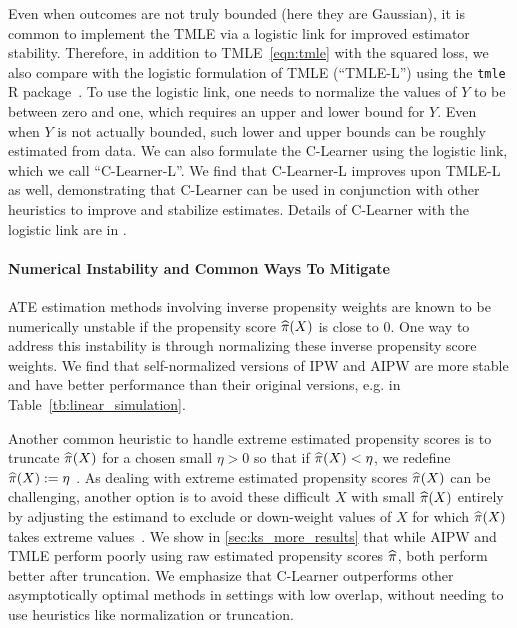 Even when outcomes are not truly bounded (here they are Gaussian), it is common to implement the TMLE via a logistic link for improved estimator stability. Therefore, %
in addition to TMLE~\eqref{eqn:tmle} with the squared loss, we also compare with the logistic formulation of TMLE (``TMLE-L'') using the \texttt{tmle} R package~\citep{gruber2012tmle}. To use the logistic link, one needs to normalize the values of $Y$ to be between zero and one, which requires an upper and lower bound for $Y$. Even when $Y$ is not actually bounded, such lower and upper bounds can be roughly estimated from data. %
We can also formulate the C-Learner using the logistic link, which we call ``C-Learner-L''. We find that C-Learner-L improves upon TMLE-L as well, demonstrating that C-Learner can be used in conjunction with other heuristics to improve and stabilize estimates. Details of C-Learner with the logistic link are in .




\paragraph{Numerical Instability and Common Ways To Mitigate}


ATE estimation methods involving inverse propensity weights are known to be numerically unstable if the propensity score $\widehat{\pi}(X)$ is close to 0. One way to address this instability %
is through normalizing these inverse propensity score weights. We find that self-normalized versions of IPW and AIPW are more stable and have better performance than their original versions, e.g. in Table~\ref{tb:linear_simulation}.  

Another common heuristic to handle extreme estimated propensity scores is to truncate $\widehat{\pi}(X)$ for a chosen small $\eta>0$ so that if $\widehat{\pi}(X)<\eta$, we redefine $\widehat{\pi}(X) := \eta$ \citep{ding2023course,cole2008constructing}. %
As dealing with extreme estimated propensity scores $\widehat{\pi}(X)$ can be challenging, another option is to avoid these difficult $X$ with small $\widehat{\pi}(X)$ entirely by adjusting the estimand to exclude or down-weight values of $X$ for which $\widehat{\pi}(X)$ takes extreme values~\citep{CrumpHoImMi06,li18}. 
We show in \cref{sec:ks_more_results} that while AIPW and TMLE perform poorly using raw estimated propensity scores $\widehat{\pi}$, both perform better after truncation. 
We emphasize that C-Learner outperforms other asymptotically optimal methods in settings with low overlap, without needing to use heuristics like normalization or truncation. 

